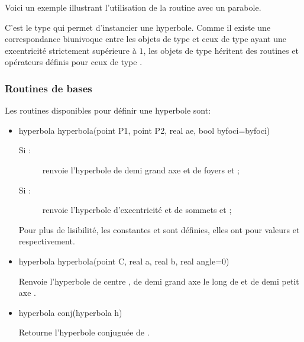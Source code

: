 \documentclass[pdftex]{article}
\begin{document}
\begin{itemize}
  Voici un exemple illustrant l'utilisation de la routine
   avec un parabole.
\end{itemize}

C'est le type  qui permet d'instancier une hyperbole.
Comme il existe une correspondance biunivoque entre les objets de type
 et ceux de type  ayant une excentricité
strictement supérieure à $1$, les objets de type  héritent des
routines et opérateurs définis pour ceux de type .

\subsubsection{Routines de bases}
Les routines disponibles pour définir une hyperbole sont:
\begin{itemize}
\item {}
  \begin{Vcolor}
    hyperbola hyperbola(point P1, point P2, real ae, bool byfoci=byfoci)
  \end{Vcolor}
  \begin{description}
  \item[Si :] renvoie l'hyperbole de demi grand axe
     et de foyers  et ;
  \item[Si :] renvoie l'hyperbole d'excentricité
     et de sommets  et ;
  \end{description}
  Pour plus de lisibilité, les constantes 
  et  sont définies, elles ont pour valeurs 
  et  respectivement.
\item {}
  \begin{Vcolor}
    hyperbola hyperbola(point C, real a, real b, real angle=0)
  \end{Vcolor}
  Renvoie l'hyperbole de centre , de demi grand axe 
  le long de  et de \og{}demi petit
  axe\fg{} .
\item {}
  \begin{Vcolor}
    hyperbola conj(hyperbola h)
  \end{Vcolor}
  Retourne l'hyperbole conjuguée de .
\end{itemize}
\end{document}
